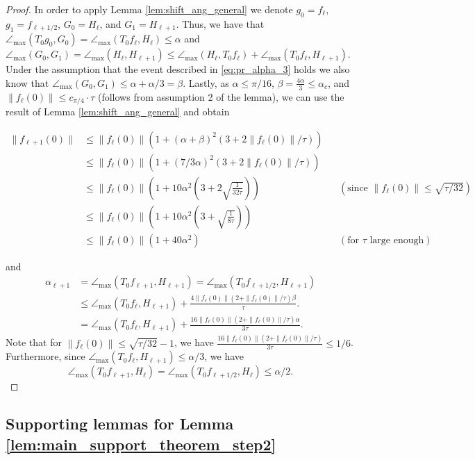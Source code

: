 \documentclass[12pt]{article}
\theoremstyle{remark}
\newcommand{\maxangle}{\angle_{\max}}
\begin{document}
\begin{appendices}
\begin{proof}
In order to apply Lemma \ref{lem:shift_ang_general} we denote $g_0 = f_\ell$, $g_1 = f_{\ell+1/2}$, $G_0 = H_\ell$, and $G_1 = H_{\ell+1}$.
Thus, we have that $\maxangle (T_0g_0, G_0) = \maxangle (T_0f_\ell, H_\ell)\leq \alpha$ and  $\maxangle(G_0,G_1) = \maxangle(H_\ell,H_{\ell+1})\leq \maxangle(H_\ell,T_0f_\ell) + \maxangle(T_0f_\ell,H_{\ell+1})$.
Under the assumption that the event described in \eqref{eq:pr_alpha_3} holds we also know that $\maxangle(G_0,G_1)  \leq \alpha + \alpha/3 = \beta$.
Lastly, as $\alpha \leq \pi/16$, $\beta = \frac{4\alpha}{3} \leq \alpha_c$, and  $\|f_\ell(0)\| \leq c_{\pi/4} \cdot \tau $ (follows from assumption 2 of the lemma), we can use the result of Lemma  \ref{lem:shift_ang_general} and obtain 

\begin{align*}
\|f_{\ell+1}(0)\| &\leq \|f_{\ell}(0)\|(1+(\alpha+\beta)^2 (3+ 2\|f_{\ell}(0)\|/\tau) ) 
\\&
\leq \|f_\ell(0)\|(1+(7/3\alpha)^2 (3+ 2\|f_\ell(0)\|/\tau) ) 
\\&
\leq \|f_\ell(0)\|\left(1+10\alpha^2 \left(3+ 2\sqrt{\frac{1}{32\tau}}\right) \right)
&& \left(\text{since } \|f_\ell(0)\| \leq \sqrt{\tau/32} \right)
\\&
\leq 
\|f_\ell(0)\|\left(1+10\alpha^2 \left(3+ \sqrt{\frac{1}{8\tau}}\right) \right)
\\&
\leq \|f_\ell(0)\|\left(1+40\alpha^2\right) && \left(\text{for } \tau \text{ large enough}\right)
\end{align*}

and 
\[
\begin{aligned}
    \alpha_{\ell+1} &= \maxangle (T_0f_{\ell+1}, H_{\ell+1}) = \maxangle (T_0f_{\ell+1/2}, H_{\ell+1}) \\&\leq \maxangle(T_0f_\ell,H_{\ell+1})  +
    \frac{4\|f_\ell(0)\|\left(2+\|f_\ell(0)\|/\tau\right) \beta} {\tau}.
    \\&= \maxangle(T_0f_\ell,H_{\ell+1})  +
    \frac{16\|f_\ell(0)\|\left(2+\|f_\ell(0)\|/\tau\right) \alpha} {3\tau}.
\end{aligned}
\]
Note that for $\|f_\ell(0)\| \leq\sqrt{\tau/32} -1$, we have $\frac{16\|f_\ell(0)\|\left(2+\|f_\ell(0)\|/\tau\right)} {3\tau}\leq 1/6$.
Furthermore, since $\maxangle(T_0f_\ell,H_{\ell+1}) \leq \alpha/3$, we have 
\[
\maxangle (T_0f_{\ell+1}, H_\ell)  = \maxangle (T_0f_{\ell+1/2}, H_\ell) \leq \alpha/2
.\]
\end{proof}



\subsection{Supporting lemmas for Lemma \ref{lem:main_support_theorem_step2}}
\label{sec:ProofofLemAlphaHalf}


\end{appendices}
\end{document}

